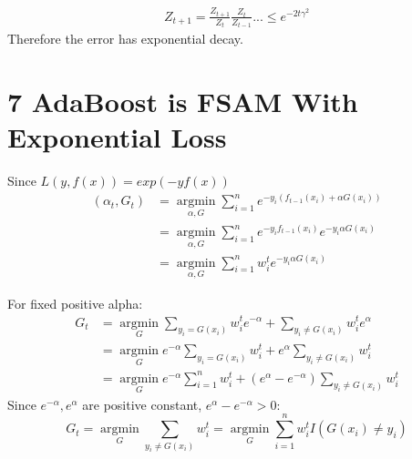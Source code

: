 \documentclass{article}
\newenvironment{sub}[2][$-$]{\begin{trivlist}
		\item[\hskip \labelsep {\bfseries #1}\hskip \labelsep {\bfseries #2.}]}  {\end{trivlist}}
\begin{document}
\begin{sub}{6.6}
 \begin{align}
 Z_{t+1} = \frac{Z_{t+1}}{Z_t}  \frac{Z_{t}}{Z_{t-1}} ... \leq  e^{-2t\gamma^2}
 \end{align}
Therefore the error has exponential decay.	
\end{sub}

\section{7 AdaBoost is FSAM With Exponential Loss}
\begin{sub}{7.1}
\end{sub}
Since $ L(y,f(x)) = exp(-yf(x))$
\begin{align}
	  (\alpha_t,G_t) &=  \underset{\alpha, G}{\operatorname{arg min}} \sum_{i=1}^n e^{-y_i(f_{t-1}(x_i)+\alpha G(x_i))}\\
	  &= \underset{\alpha, G}{\operatorname{arg min}} \sum_{i=1}^n e^{-y_if_{t-1}(x_i)}e^{-y_i\alpha G(x_i)}\\
	  &= \underset{\alpha, G}{\operatorname{arg min}} \sum_{i=1}^n w_i^te^{-y_i\alpha G(x_i)}
\end{align} 

\begin{sub}{7.2}
\end{sub}
For fixed positive alpha:
\begin{align}
G_t &= \underset{G}{\operatorname{arg min}} \sum_{y_i = G(x_i)} w_i^te^{-\alpha} +  \sum_{y_i \neq G(x_i)} w_i^te^{\alpha}\\
&=  \underset{G}{\operatorname{arg min}}e^{-\alpha} \sum_{y_i = G(x_i)} w_i^t + e^{\alpha} \sum_{y_i \neq G(x_i)} w_i^t\\
& =  \underset{G}{\operatorname{arg min}} e^{-\alpha}  \sum_{i=1}^n w_i^t + (e^{\alpha} - e^{-\alpha}) \sum_{y_i \neq G(x_i)} w_i^t
\end{align}
Since $e^{-\alpha},e^{\alpha}$ are positive constant, $e^{\alpha} - e^{-\alpha} >0$:\\
$$G_t =  \underset{G}{\operatorname{arg min}} \sum_{y_i \neq G(x_i)} w_i^t = \underset{G}{\operatorname{arg min}} \sum_{i=1}^n  w_i^t I(G(x_i) \neq y_i)$$
\end{document}

